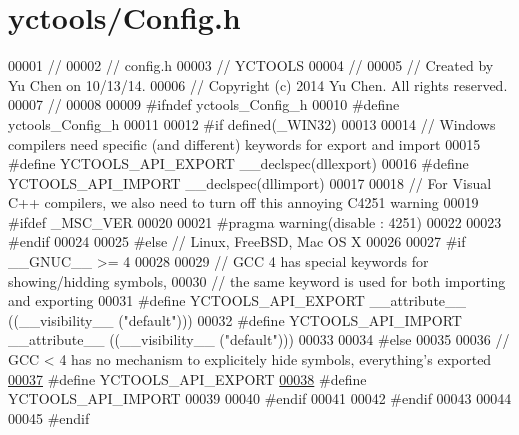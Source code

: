 \hypertarget{yctools_2_config_8h_source}{}\section{yctools/\+Config.h}
\label{yctools_2_config_8h_source}

\begin{DoxyCode}
00001 \textcolor{comment}{//}
00002 \textcolor{comment}{//  config.h}
00003 \textcolor{comment}{//  YCTOOLS}
00004 \textcolor{comment}{//}
00005 \textcolor{comment}{//  Created by Yu Chen on 10/13/14.}
00006 \textcolor{comment}{//  Copyright (c) 2014 Yu Chen. All rights reserved.}
00007 \textcolor{comment}{//}
00008 
00009 \textcolor{preprocessor}{#ifndef yctools\_Config\_h}
00010 \textcolor{preprocessor}{#define yctools\_Config\_h}
00011 
00012 \textcolor{preprocessor}{#if defined(\_WIN32)}
00013 
00014 \textcolor{comment}{// Windows compilers need specific (and different) keywords for export and import}
00015 \textcolor{preprocessor}{#define YCTOOLS\_API\_EXPORT \_\_declspec(dllexport)}
00016 \textcolor{preprocessor}{#define YCTOOLS\_API\_IMPORT \_\_declspec(dllimport)}
00017 
00018 \textcolor{comment}{// For Visual C++ compilers, we also need to turn off this annoying C4251 warning}
00019 \textcolor{preprocessor}{#ifdef \_MSC\_VER}
00020 
00021 \textcolor{preprocessor}{#pragma warning(disable : 4251)}
00022 
00023 \textcolor{preprocessor}{#endif}
00024 
00025 \textcolor{preprocessor}{#else // Linux, FreeBSD, Mac OS X}
00026 
00027 \textcolor{preprocessor}{#if \_\_GNUC\_\_ >= 4}
00028 
00029 \textcolor{comment}{// GCC 4 has special keywords for showing/hidding symbols,}
00030 \textcolor{comment}{// the same keyword is used for both importing and exporting}
00031 \textcolor{preprocessor}{#define YCTOOLS\_API\_EXPORT \_\_attribute\_\_ ((\_\_visibility\_\_ ("default")))}
00032 \textcolor{preprocessor}{#define YCTOOLS\_API\_IMPORT \_\_attribute\_\_ ((\_\_visibility\_\_ ("default")))}
00033 
00034 \textcolor{preprocessor}{#else}
00035 
00036 \textcolor{comment}{// GCC < 4 has no mechanism to explicitely hide symbols, everything's exported}
\hypertarget{yctools_2_config_8h_source_l00037}{}\hyperlink{yctools_2_config_8h_a10500c93b4947e5f6b5ed5725422c96c}{00037} \textcolor{preprocessor}{#define YCTOOLS\_API\_EXPORT}
\hypertarget{yctools_2_config_8h_source_l00038}{}\hyperlink{yctools_2_config_8h_a1f45950b398335d70825c0a311a6bd7e}{00038} \textcolor{preprocessor}{#define YCTOOLS\_API\_IMPORT}
00039 
00040 \textcolor{preprocessor}{#endif}
00041 
00042 \textcolor{preprocessor}{#endif}
00043 
00044 
00045 \textcolor{preprocessor}{#endif}
\end{DoxyCode}

